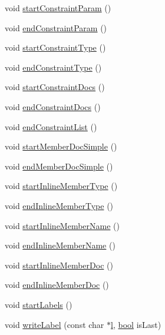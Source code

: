 \begin{DoxyCompactItemize}
\item 
void \hyperlink{class_latex_generator_ae6ec7c8f63ab59e21b67d94098598226}{start\+Constraint\+Param} ()
\item 
void \hyperlink{class_latex_generator_aa5de32252d0077923cc12a3b85680f0a}{end\+Constraint\+Param} ()
\item 
void \hyperlink{class_latex_generator_a25d8896cd81e657b37775af2a331761d}{start\+Constraint\+Type} ()
\item 
void \hyperlink{class_latex_generator_a752b5bd6ac615dee39c6c9c9e296f1dd}{end\+Constraint\+Type} ()
\item 
void \hyperlink{class_latex_generator_a88eb70bdc53db662b4b4292ca3fafbb3}{start\+Constraint\+Docs} ()
\item 
void \hyperlink{class_latex_generator_a46875df306394c532e545e2d7f599e6c}{end\+Constraint\+Docs} ()
\item 
void \hyperlink{class_latex_generator_a2efc2387efe483773b46ac00f82d13cc}{end\+Constraint\+List} ()
\item 
void \hyperlink{class_latex_generator_a82bea191b6d5a6dc61e31ec36115e975}{start\+Member\+Doc\+Simple} ()
\item 
void \hyperlink{class_latex_generator_a4d3f427461fc381eee9b513d3f5f0a84}{end\+Member\+Doc\+Simple} ()
\item 
void \hyperlink{class_latex_generator_a44918d04425a332e92e30465f7e05a64}{start\+Inline\+Member\+Type} ()
\item 
void \hyperlink{class_latex_generator_abc814eeab82521846cf18686f8d92fac}{end\+Inline\+Member\+Type} ()
\item 
void \hyperlink{class_latex_generator_ab5f38cdf65246dfa8b1c36a3273ed3cf}{start\+Inline\+Member\+Name} ()
\item 
void \hyperlink{class_latex_generator_ab92ba4ec639de4be31f04be7333de37a}{end\+Inline\+Member\+Name} ()
\item 
void \hyperlink{class_latex_generator_af315eca185ea2b54cafe21c589550051}{start\+Inline\+Member\+Doc} ()
\item 
void \hyperlink{class_latex_generator_ad923c683685b854937c49870db835f48}{end\+Inline\+Member\+Doc} ()
\item 
void \hyperlink{class_latex_generator_a71809b49388e139615299e801e09ab89}{start\+Labels} ()
\item 
void \hyperlink{class_latex_generator_a9eb12e8e19b14d1597b58663df0475cd}{write\+Label} (const char $\ast$\hyperlink{060__command__switch_8tcl_aff56f84b49947b84b2a304f51cf8e678}{l}, \hyperlink{qglobal_8h_a1062901a7428fdd9c7f180f5e01ea056}{bool} is\+Last)

\end{DoxyCompactItemize}
